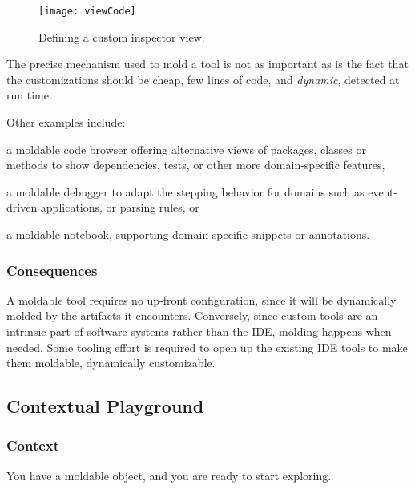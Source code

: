 \documentclass[sigconf]{acmart}
\renewcommand{\nbc}[3]{} %
\newcommand\on[1]{\nbc{ON}{#1}{olive}} %
\newcommand\kh[1]{\nbc{Konrad}{#1}{violet}}
\begin{document}
\begin{figure}[h]
  \texttt{[image: viewCode]}
  \caption{Defining a custom inspector view.}
  \label{fig:viewCode}
\end{figure}

The precise mechanism used to mold a tool is not as important as is the fact that the customizations should be cheap, \ie few lines of code, and \emph{dynamic}, \ie detected at run time.

Other examples include:
\begin{inparaenum}[(i)]
\item a moldable code browser offering alternative views of packages, classes or methods to show dependencies, tests, or other more domain-specific features,
\item a moldable debugger to adapt the stepping behavior for domains such as event-driven applications, or parsing rules, or
\item a moldable notebook, supporting domain-specific snippets or annotations.
\end{inparaenum}

\subsubsection*{Consequences}
A moldable tool requires no up-front configuration, since it will be dynamically molded by the artifacts it encounters.
Conversely, since custom tools are an intrinsic part of software systems rather than the IDE, molding happens when needed.
Some tooling effort is required to open up the existing IDE tools to make them moldable, \ie dynamically customizable.

\subsection*{Contextual Playground}\label{pat:contextualPlayground}
\kh{"Contextual Playground" is a pattern, but I'd label it "process" rather
than "tooling". On the other hand, it's also reasonable to have it right
before "Custom View", as it's a preparation to tooling work.}
\subsubsection*{Context}
You have a moldable object, and you are ready to start exploring.
\end{document}
